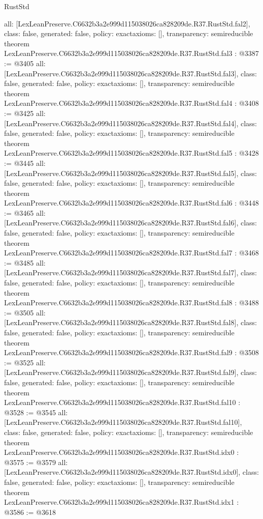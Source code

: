 \begin{lexlean}{RustStd}
\begin{coremodule}
{  all: [LexLeanPreserve.C6632b3a2e999d115038026ca828209de.R37.RustStd.fal2],
  class: false,
  generated: false,
  policy: exact{axioms: []},
  transparency: semireducible
}
theorem LexLeanPreserve.C6632b3a2e999d115038026ca828209de.R37.RustStd.fal3 : @3387 := @3405 {
  all: [LexLeanPreserve.C6632b3a2e999d115038026ca828209de.R37.RustStd.fal3],
  class: false,
  generated: false,
  policy: exact{axioms: []},
  transparency: semireducible
}
theorem LexLeanPreserve.C6632b3a2e999d115038026ca828209de.R37.RustStd.fal4 : @3408 := @3425 {
  all: [LexLeanPreserve.C6632b3a2e999d115038026ca828209de.R37.RustStd.fal4],
  class: false,
  generated: false,
  policy: exact{axioms: []},
  transparency: semireducible
}
theorem LexLeanPreserve.C6632b3a2e999d115038026ca828209de.R37.RustStd.fal5 : @3428 := @3445 {
  all: [LexLeanPreserve.C6632b3a2e999d115038026ca828209de.R37.RustStd.fal5],
  class: false,
  generated: false,
  policy: exact{axioms: []},
  transparency: semireducible
}
theorem LexLeanPreserve.C6632b3a2e999d115038026ca828209de.R37.RustStd.fal6 : @3448 := @3465 {
  all: [LexLeanPreserve.C6632b3a2e999d115038026ca828209de.R37.RustStd.fal6],
  class: false,
  generated: false,
  policy: exact{axioms: []},
  transparency: semireducible
}
theorem LexLeanPreserve.C6632b3a2e999d115038026ca828209de.R37.RustStd.fal7 : @3468 := @3485 {
  all: [LexLeanPreserve.C6632b3a2e999d115038026ca828209de.R37.RustStd.fal7],
  class: false,
  generated: false,
  policy: exact{axioms: []},
  transparency: semireducible
}
theorem LexLeanPreserve.C6632b3a2e999d115038026ca828209de.R37.RustStd.fal8 : @3488 := @3505 {
  all: [LexLeanPreserve.C6632b3a2e999d115038026ca828209de.R37.RustStd.fal8],
  class: false,
  generated: false,
  policy: exact{axioms: []},
  transparency: semireducible
}
theorem LexLeanPreserve.C6632b3a2e999d115038026ca828209de.R37.RustStd.fal9 : @3508 := @3525 {
  all: [LexLeanPreserve.C6632b3a2e999d115038026ca828209de.R37.RustStd.fal9],
  class: false,
  generated: false,
  policy: exact{axioms: []},
  transparency: semireducible
}
theorem LexLeanPreserve.C6632b3a2e999d115038026ca828209de.R37.RustStd.fal10 : @3528 := @3545 {
  all: [LexLeanPreserve.C6632b3a2e999d115038026ca828209de.R37.RustStd.fal10],
  class: false,
  generated: false,
  policy: exact{axioms: []},
  transparency: semireducible
}
theorem LexLeanPreserve.C6632b3a2e999d115038026ca828209de.R37.RustStd.idx0 : @3575 := @3579 {
  all: [LexLeanPreserve.C6632b3a2e999d115038026ca828209de.R37.RustStd.idx0],
  class: false,
  generated: false,
  policy: exact{axioms: []},
  transparency: semireducible
}
theorem LexLeanPreserve.C6632b3a2e999d115038026ca828209de.R37.RustStd.idx1 : @3586 := @3618 {
}
\end{coremodule}
\end{lexlean}
